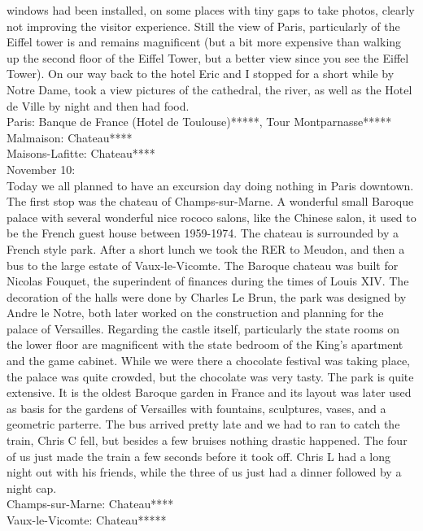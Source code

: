 windows had been installed, on some places with tiny gaps to take photos, clearly not improving the visitor experience. Still the view of Paris, particularly of the Eiffel tower is and remains magnificent (but a bit more expensive than walking up the second floor of the Eiffel Tower, but a better view since you see the Eiffel Tower). On our way back to the hotel Eric and I stopped for a short while by Notre Dame, took a view pictures of the cathedral, the river, as well as the Hotel de Ville by night and then had food.\\

Paris: Banque de France (Hotel de Toulouse)*****, Tour Montparnasse*****\\
Malmaison: Chateau****\\
Maisons-Lafitte: Chateau****\\

November 10:\\
Today we all planned to have an excursion day doing nothing in Paris downtown. The first stop was the chateau of Champs-sur-Marne. A wonderful small Baroque palace with several wonderful nice rococo salons, like the Chinese salon, it used to be the French guest house between 1959-1974. The chateau is surrounded by a French style park. After a short lunch we took the RER to Meudon, and then a bus to the large estate of Vaux-le-Vicomte. The Baroque chateau was built for Nicolas Fouquet, the superindent of finances during the times of Louis XIV. The decoration of the halls were done by Charles Le Brun, the park was designed by Andre le Notre, both later worked on the construction and planning for the palace of Versailles. Regarding the castle itself, particularly the state rooms on the lower floor are magnificent with the state bedroom of the King's apartment and the game cabinet. While we were there a chocolate festival was taking place, the palace was quite crowded, but the chocolate was very tasty. The park is quite extensive. It is the oldest Baroque garden in France and its layout was later used as basis for the gardens of Versailles with fountains, sculptures, vases, and a geometric parterre. The bus arrived pretty late and we had to ran to catch the train, Chris C fell, but besides a few bruises nothing drastic happened. The four of us just made the train a few seconds before it took off. Chris L had a long night out with his friends, while the three of us just had a dinner followed by a night cap.\\

Champs-sur-Marne: Chateau****\\
Vaux-le-Vicomte: Chateau*****\\

